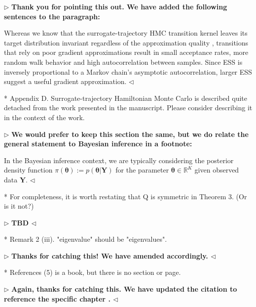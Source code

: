 \documentclass[12pt]{article}
\newenvironment{reply}{$\triangleright$\bfseries}{$\triangleleft$}
\renewenvironment{quote}
               {\list{}{\rightmargin\leftmargin}%
                \item\relax\normalfont}
               {\endlist}
\newcommand{\ttheta}{\boldsymbol{\theta}}
\begin{document}
\begin{reply}
	Thank you for pointing this out.  We have added the following sentences to the paragraph:
	\begin{quote}
		Whereas we know that the surrogate-trajectory HMC transition kernel leaves its target distribution invariant regardless of the approximation quality \citep{glatt2020accept}, transitions that rely on poor gradient approximations result in small acceptance rates, more random walk behavior and high autocorrelation between samples.  Since ESS is inversely proportional to a Markov chain's asymptotic autocorrelation, larger ESS suggest a useful gradient approximation.
	\end{quote}
\end{reply}

* Appendix D. Surrogate-trajectory Hamiltonian Monte Carlo is described quite detached from the work presented in the manuscript. Please consider describing it in the context of the work. 

\newcommand{\Y}{\mathbf{Y}}
\begin{reply}
	We would prefer to keep this section the same, but we do relate the general statement to Bayesian inference in a footnote:
	\begin{quote}
		In the Bayesian inference context, we are typically
		considering the posterior density function
		$\pi(\ttheta):=p(\ttheta|\Y)$ for the parameter
		$\ttheta\in\mathbb{R}^K$ given observed data $\Y$.
	\end{quote}
\end{reply}

* For completeness, it is worth restating that Q is symmetric in Theorem 3. (Or is it not?) 

\begin{reply}
TBD	
\end{reply}

* Remark 2 (iii). "eigenvalue" should be "eigenvalues". 

\begin{reply}
Thanks for catching this!  We have amended accordingly. 
\end{reply}

* References (5) is a book, but there is no section or page.

\begin{reply}
	Again, thanks for catching this.  We have updated the citation to reference the specific chapter \cite{norris_1997}.
\end{reply}
\end{document}
